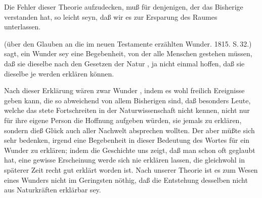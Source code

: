 Die Fehler dieser Theorie aufzudecken, muß für denjenigen, der das Bisherige verstanden hat, so leicht seyn, daß wir es zur Ersparung des Raumes unterlassen.~
\begin{aufza}\setcounter{enumi}{11}
\item {} (über den Glauben an die im neuen Testamente erzählten Wunder. 1815. S.\,32.) sagt, ein Wunder sey eine Begebenheit, von der alle Menschen gestehen müssen, daß sie dieselbe nach den Gesetzen der Natur , ja nicht einmal hoffen, daß sie dieselbe je werden erklären können.
\end{aufza}\par
Nach dieser Erklärung wären zwar Wunder , indem es wohl freilich Ereignisse geben kann, die so abweichend von allem Bisherigen sind, daß besonders Leute, welche das stete Fortschreiten in der Naturwissenschaft nicht kennen, nicht nur für ihre eigene Person die Hoffnung aufgeben würden, sie jemals zu erklären, sondern dieß Glück auch aller Nachwelt absprechen wollten. Der  aber müßte sich sehr bedenken, irgend eine Begebenheit in dieser Bedeutung des Wortes für ein Wunder zu erklären; indem die Geschichte uns zeigt, daß man schon oft geglaubt hat, eine gewisse Erscheinung werde sich nie erklären lassen, die gleichwohl in späterer Zeit recht gut erklärt worden ist. Nach unserer Theorie ist es zum Wesen eines Wunders nicht im Geringsten nöthig, daß die Entstehung desselben nicht aus Naturkräften erklärbar sey.

